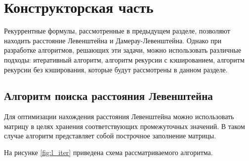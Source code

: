 \chapter{Конструкторская часть}

Рекуррентные формулы, рассмотренные в предыдущем разделе, позволяют находить расстояние Левенштейна и Дамерау-Левенштейна. Однако при разработке алгоритмов, решающих эти задачи, можно использовать различные подходы: итеративный алгоритм, алгоритм рекурсии с кэшированием, алгоритм рекурсии без кэширования, которые будут рассмотрены в данном разделе.

\section{Алгоритм поиска расстояния Левенштейна}

Для оптимизации нахождения расстояния Левенштейна можно использовать матрицу в целях хранения соответствующих промежуточных значений. В таком случае алгоритм представляет собой построчное заполнение матрицы. 

На рисунке \ref{fig:l_iter} приведена схема рассматриваемого алгоритма.

